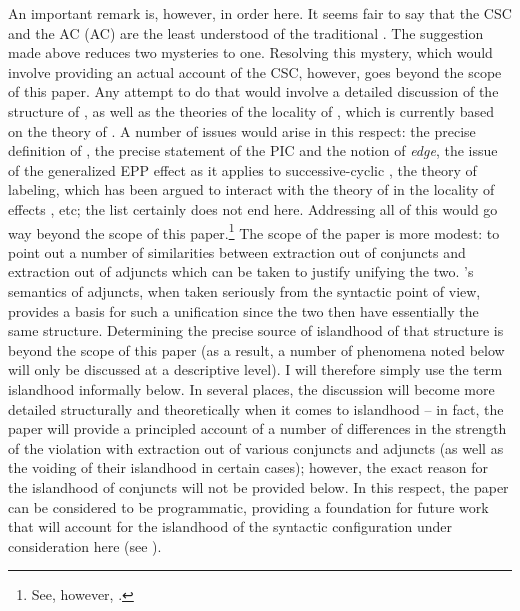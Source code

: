 \documentclass[output=paper]{langsci/langscibook}
\begin{document}
An important remark is, however, in order here. It seems fair to say that the
\gls{CSC} and the \glsdesc{AC} (\gls{AC}) are the least understood of the
traditional . The suggestion made above reduces two mysteries to one.
Resolving this mystery, which would involve providing an actual account of the
\gls{CSC}, however, goes beyond the scope of this paper. Any attempt to do that
would involve a detailed discussion of the structure of , as well
as the theories of the locality of , which is currently based on the
theory of . A number of issues would arise in this respect: the precise
definition of , the precise statement of the \gls{PIC}
and the notion of \emph{edge}, the issue of the generalized
\gls{EPP} effect as
it applies to successive-cyclic , the theory of labeling, which has
been argued to interact with the theory of  in the locality of 
effects \parencite[see][]{Boskovic2015,Boskovic2018}, etc; the list certainly
does not end here. Addressing all of this would go way beyond the scope of this
paper.\footnote{See, however, \citet{Boskovic2017,Boskovicinprep}.} The
scope of the paper is more modest: to point out a number of similarities
between extraction out of conjuncts and extraction out of adjuncts which can be
taken to justify unifying the two. \citeauthor{Higginbotham1985}’s semantics of
adjuncts, when taken seriously from the syntactic point of view, provides a
basis for such a unification since the two then have essentially the same
structure. Determining the precise source of islandhood of that structure is
beyond the scope of this paper (as a result, a number of phenomena noted below
will only be discussed at a descriptive level). I will therefore simply use the
term islandhood informally below. In several places, the discussion will become
more detailed structurally and theoretically when it comes to islandhood – in
fact, the paper will provide a principled account of a number of differences in
the strength of the violation with extraction out of various conjuncts and
adjuncts (as well as the voiding of their islandhood in certain cases);
however, the exact reason for the islandhood of conjuncts will not be provided
below. In this respect, the paper can be considered to be programmatic,
providing a foundation for future work that will account for the islandhood of
the syntactic configuration under consideration here (see
\citealt{Boskovicinprep}).
\end{document}
